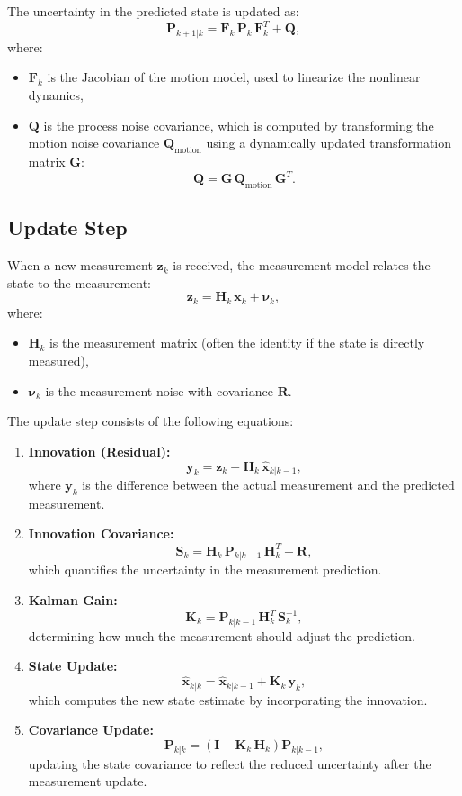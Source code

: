 The uncertainty in the predicted state is updated as:
\[
\bm{P}_{k+1|k} = \bm{F}_k\, \bm{P}_k\, \bm{F}_k^T + \bm{Q},
\]
where:
\begin{itemize}
    \item \(\bm{F}_k\) is the Jacobian of the motion model, used to linearize the nonlinear dynamics,
    \item \(\bm{Q}\) is the process noise covariance, which is computed by transforming the motion noise covariance \(\bm{Q}_{\text{motion}}\) using a dynamically updated transformation matrix \(\bm{G}\):
    \[
    \bm{Q} = \bm{G}\, \bm{Q}_{\text{motion}}\, \bm{G}^T.
    \]
\end{itemize}

\subsection*{Update Step}

When a new measurement \(\bm{z}_k\) is received, the measurement model relates the state to the measurement:
\[
\bm{z}_k = \bm{H}_k\, \bm{x}_k + \bm{\nu}_k,
\]
where:
\begin{itemize}
    \item \(\bm{H}_k\) is the measurement matrix (often the identity if the state is directly measured),
    \item \(\bm{\nu}_k\) is the measurement noise with covariance \(\bm{R}\).
\end{itemize}

The update step consists of the following equations:

\begin{enumerate}
    \item \textbf{Innovation (Residual):}
    \[
    \bm{y}_k = \bm{z}_k - \bm{H}_k\, \hat{\bm{x}}_{k|k-1},
    \]
    \noindent where \(\bm{y}_k\) is the difference between the actual measurement and the predicted measurement.
    
    \item \textbf{Innovation Covariance:}
    \[
    \bm{S}_k = \bm{H}_k\, \bm{P}_{k|k-1}\, \bm{H}_k^T + \bm{R},
    \]
    \noindent which quantifies the uncertainty in the measurement prediction.
    
    \item \textbf{Kalman Gain:}
    \[
    \bm{K}_k = \bm{P}_{k|k-1}\, \bm{H}_k^T\, \bm{S}_k^{-1},
    \]
    \noindent determining how much the measurement should adjust the prediction.
    
    \item \textbf{State Update:}
    \[
    \hat{\bm{x}}_{k|k} = \hat{\bm{x}}_{k|k-1} + \bm{K}_k\, \bm{y}_k,
    \]
    \noindent which computes the new state estimate by incorporating the innovation.
    
    \item \textbf{Covariance Update:}
    \[
    \bm{P}_{k|k} = \left(\bm{I} - \bm{K}_k\, \bm{H}_k\right) \bm{P}_{k|k-1},
    \]
    \noindent updating the state covariance to reflect the reduced uncertainty after the measurement update.
\end{enumerate}

